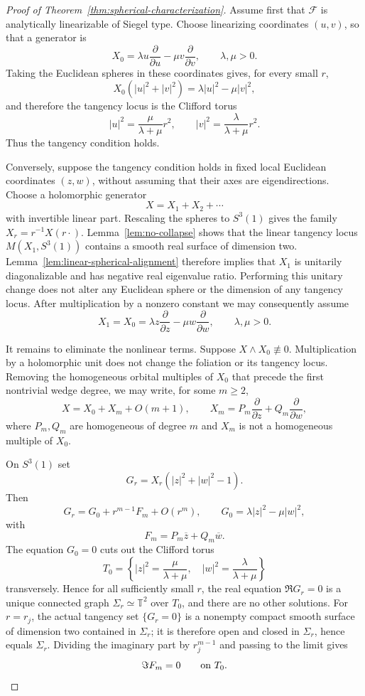 \documentclass[11pt,reqno]{article}
\theoremstyle{remark}
\newcommand{\F}{\mathcal F}
\newcommand{\T}{\mathbb T}
\newcommand{\pd}{\partial}
\newcommand{\ol}{\overline}
\begin{document}
\begin{proof}[Proof of Theorem~\ref{thm:spherical-characterization}]
Assume first that $\F$ is analytically linearizable of Siegel type. Choose linearizing coordinates $(u,v)$, so that a generator is
\[
 X_0=\lambda u\frac{\pd}{\pd u}-\mu v\frac{\pd}{\pd v},
 \qquad \lambda,\mu>0.
\]
Taking the Euclidean spheres in these coordinates gives, for every small $r$,
\[
 X_0(|u|^2+|v|^2)=\lambda|u|^2-\mu|v|^2,
\]
and therefore the tangency locus is the Clifford torus
\[
 |u|^2=\frac{\mu}{\lambda+\mu}r^2,
 \qquad
 |v|^2=\frac{\lambda}{\lambda+\mu}r^2.
\]
Thus the tangency condition holds.

Conversely, suppose the tangency condition holds in fixed local Euclidean coordinates $(z,w)$, without assuming that their axes are eigendirections. Choose a holomorphic generator
\[
 X=X_1+X_2+\cdots
\]
with invertible linear part. Rescaling the spheres to $S^3(1)$ gives the family $X_r=r^{-1}X(r\cdot)$. Lemma~\ref{lem:no-collapse} shows that the linear tangency locus $M(X_1,S^3(1))$ contains a smooth real surface of dimension two. Lemma~\ref{lem:linear-spherical-alignment} therefore implies that $X_1$ is unitarily diagonalizable and has negative real eigenvalue ratio. Performing this unitary change does not alter any Euclidean sphere or the dimension of any tangency locus. After multiplication by a nonzero constant we may consequently assume
\[
 X_1=X_0=\lambda z\frac{\pd}{\pd z}-\mu w\frac{\pd}{\pd w},
 \qquad \lambda,\mu>0.
\]

It remains to eliminate the nonlinear terms. Suppose $X\wedge X_0\not\equiv0$. Multiplication by a holomorphic unit does not change the foliation or its tangency locus. Removing the homogeneous orbital multiples of $X_0$ that precede the first nontrivial wedge degree, we may write, for some $m\ge2$,
\[
 X=X_0+X_m+O(m+1),
 \qquad
 X_m=P_m\frac{\pd}{\pd z}+Q_m\frac{\pd}{\pd w},
\]
where $P_m,Q_m$ are homogeneous of degree $m$ and $X_m$ is not a homogeneous multiple of $X_0$.

On $S^3(1)$ set
\[
 G_r=X_r(|z|^2+|w|^2-1).
\]
Then
\[
 G_r=G_0+r^{m-1}F_m+O(r^m),
 \qquad
 G_0=\lambda|z|^2-\mu|w|^2,
\]
with
\[
 F_m=P_m\ol z+Q_m\ol w.
\]
The equation $G_0=0$ cuts out the Clifford torus
\[
 T_0=\left\{|z|^2=\frac{\mu}{\lambda+\mu},\quad
 |w|^2=\frac{\lambda}{\lambda+\mu}\right\}
\]
transversely. Hence for all sufficiently small $r$, the real equation $\Re G_r=0$ is a unique connected graph $\Sigma_r\simeq\T^2$ over $T_0$, and there are no other solutions. For $r=r_j$, the actual tangency set $\{G_r=0\}$ is a nonempty compact smooth surface of dimension two contained in $\Sigma_r$; it is therefore open and closed in $\Sigma_r$, hence equals $\Sigma_r$. Dividing the imaginary part by $r_j^{m-1}$ and passing to the limit gives
\[
 \Im F_m=0\qquad\hbox{on }T_0.
\]


\end{proof}
\end{document}
